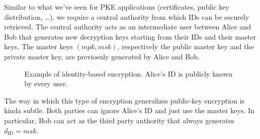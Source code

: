 \documentclass[a4paper, 12pt]{report}
\begin{document}
    Similar to what we've seen for PKE applications (certificates, public key distribution, \dots), we require a central authority from which IDs can be securely retrieved. The central authority acts as an intermediate user between Alice and Bob that generates new decryption keys starting from their IDs and their master keys. The master keys $(mpk, msk)$, respectively the public master key and the private master key, are previosuly generated by Alice and Bob.
    
    \begin{figure}[H]
        \centering


        \caption{Example of identity-based encryption. Alice's ID is publicly known by every user.}
    \end{figure}

    The way in which this type of encryption generalizes public-key encryption is kinda subtle. Both parties can ignore Alice's ID and just use the master keys. In particular, Bob can act as the third party authority that always generates $d_{\mathrm{ID}} = msk$.
\end{document}
